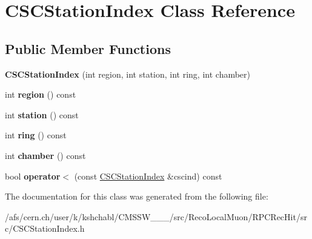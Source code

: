 \hypertarget{classCSCStationIndex}{\section{C\-S\-C\-Station\-Index Class Reference}
\label{classCSCStationIndex}
}
\subsection*{Public Member Functions}
\begin{DoxyCompactItemize}
\item 
\hypertarget{classCSCStationIndex_a64da47903fee27bb98a38059f964b416}{{\bfseries C\-S\-C\-Station\-Index} (int region, int station, int ring, int chamber)}\label{classCSCStationIndex_a64da47903fee27bb98a38059f964b416}

\item 
\hypertarget{classCSCStationIndex_adbad8966fdf34098903224551c2b5f77}{int {\bfseries region} () const }\label{classCSCStationIndex_adbad8966fdf34098903224551c2b5f77}

\item 
\hypertarget{classCSCStationIndex_a82ac0d77941ae89197242c328d91bdc0}{int {\bfseries station} () const }\label{classCSCStationIndex_a82ac0d77941ae89197242c328d91bdc0}

\item 
\hypertarget{classCSCStationIndex_a95ff4313a015e7d9ffbce0dd30bbae9c}{int {\bfseries ring} () const }\label{classCSCStationIndex_a95ff4313a015e7d9ffbce0dd30bbae9c}

\item 
\hypertarget{classCSCStationIndex_a70e1a9e4f4e248f0e4a39f0b9a07ce1c}{int {\bfseries chamber} () const }\label{classCSCStationIndex_a70e1a9e4f4e248f0e4a39f0b9a07ce1c}

\item 
\hypertarget{classCSCStationIndex_a82a3c7771262629d82c71e6fb909a755}{bool {\bfseries operator$<$} (const \hyperlink{classCSCStationIndex}{C\-S\-C\-Station\-Index} \&cscind) const }\label{classCSCStationIndex_a82a3c7771262629d82c71e6fb909a755}

\end{DoxyCompactItemize}


The documentation for this class was generated from the following file\-:\begin{DoxyCompactItemize}
\item 
/afs/cern.\-ch/user/k/kshchabl/\-C\-M\-S\-S\-W\-\_\-\_\-\_/src/\-Reco\-Local\-Muon/\-R\-P\-C\-Rec\-Hit/src/C\-S\-C\-Station\-Index.\-h\end{DoxyCompactItemize}
